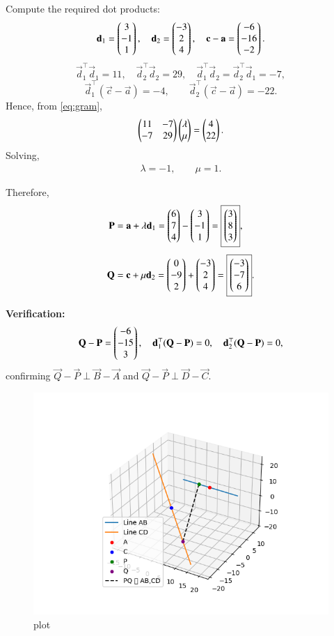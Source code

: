 \documentclass[journal]{IEEEtran}
\begin{document}
Compute the required dot products:
\begin{align}
\mathbf{d}_1=\begin{pmatrix}3\\-1\\1\end{pmatrix},\quad
\mathbf{d}_2=\begin{pmatrix}-3\\2\\4\end{pmatrix},\quad
\mathbf{c}-\mathbf{a}=\begin{pmatrix}-6\\-16\\-2\end{pmatrix}.
\end{align}
\[
\vec{d}_1^{\top}\vec{d}_1=11,\quad
\vec{d}_2^{\top}\vec{d}_2=29,\quad
\vec{d}_1^{\top}\vec{d}_2=\vec{d}_2^{\top}\vec{d}_1=-7,
\]
\[
\vec{d}_1^{\top}(\vec{c}-\vec{a})=-4,\qquad
\vec{d}_2^{\top}(\vec{c}-\vec{a})=-22.
\]
Hence, from \eqref{eq:gram},
\begin{align}
\begin{pmatrix}11 & -7\\ -7 & 29\end{pmatrix}\begin{pmatrix}\lambda\\ \mu\end{pmatrix}=\begin{pmatrix}4\\ 22\end{pmatrix}.
\end{align}
Solving,
\begin{align}
\lambda=-1,\qquad \mu=1.
\end{align}

Therefore,
\begin{align}
\mathbf{P}&=\mathbf{a}+\lambda\mathbf{d}_1
=\begin{pmatrix}6\\7\\4\end{pmatrix}-\begin{pmatrix}3\\-1\\1\end{pmatrix}
=\boxed{\begin{pmatrix}3\\8\\3\end{pmatrix}},\\[4pt]
\mathbf{Q}&=\mathbf{c}+\mu\mathbf{d}_2
=\begin{pmatrix}0\\-9\\2\end{pmatrix}+\begin{pmatrix}-3\\2\\4\end{pmatrix}
=\boxed{\begin{pmatrix}-3\\-7\\6\end{pmatrix}}.
\end{align}

\textbf{Verification:}
\begin{align}
\mathbf{Q}-\mathbf{P}=\begin{pmatrix}-6\\-15\\3\end{pmatrix},\quad
\mathbf{d}_1^{\top}(\mathbf{Q}-\mathbf{P})=0,\quad
\mathbf{d}_2^{\top}(\mathbf{Q}-\mathbf{P})=0,
\end{align}
confirming $\vec{Q}-\vec{P}\perp \vec{B}-\vec{A}$ and $\vec{Q}-\vec{P}\perp \vec{D}-\vec{C}$.

\begin{figure}[H]
\centering
\includegraphics[width=0.75\columnwidth]{figs/3.png}
\caption{\centering plot}
\label{fig:placeholder_125}
\end{figure}
\end{document}
